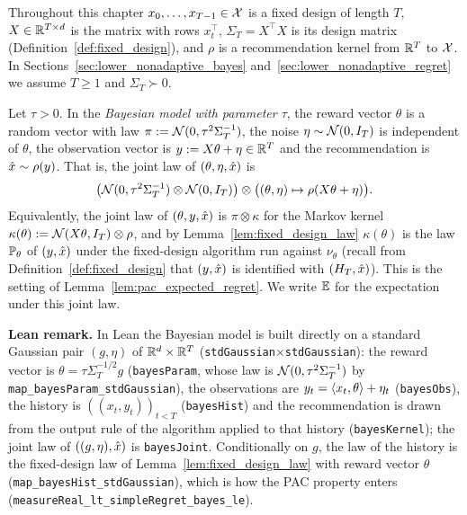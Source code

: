 Throughout this chapter $x_0, \dots, x_{T-1} \in \mathcal{X}$ is a fixed design of length $T$,
$X \in \mathbb{R}^{T\times d}$ is the matrix with rows $x_t^\top$, $\Sigma_T = X^\top X$ is its design
matrix (Definition~\ref{def:fixed_design}), and $\rho$ is a recommendation kernel from
$\mathbb{R}^T$ to $\mathcal{X}$. In Sections~\ref{sec:lower_nonadaptive_bayes}
and~\ref{sec:lower_nonadaptive_regret} we assume $T \ge 1$ and $\Sigma_T \succ 0$.

\begin{definition}\label{def:bayes_prior}
\leanok
{}
Let $\tau > 0$. In the \emph{Bayesian model with parameter $\tau$}, the reward vector
$\theta$ is a random vector with law $\pi := \mathcal{N}(0, \tau^2\Sigma_T^{-1})$, the noise
$\eta \sim \mathcal{N}(0, I_T)$ is independent of $\theta$, the observation vector is
$y := X\theta + \eta \in \mathbb{R}^T$ and the recommendation is $\hat{x} \sim \rho(y)$. That is, the
joint law of $(\theta, \eta, \hat{x})$ is
\[
  \big(\mathcal{N}(0,\tau^2\Sigma_T^{-1}) \otimes \mathcal{N}(0, I_T)\big)
  \otimes \big( (\theta,\eta) \mapsto \rho(X\theta + \eta) \big).
\]
Equivalently, the joint law of $(\theta, y, \hat{x})$ is $\pi \otimes \kappa$ for the Markov
kernel $\kappa(\theta) := \mathcal{N}(X\theta, I_T) \otimes \rho$, and by
Lemma~\ref{lem:fixed_design_law} $\kappa(\theta)$ is the law $\mathbb{P}_\theta$ of $(y, \hat{x})$ under
the fixed-design algorithm run against $\nu_\theta$ (recall from
Definition~\ref{def:fixed_design} that $(y, \hat{x})$ is identified with $(H_T, \hat{x})$). This
is the setting of Lemma~\ref{lem:pac_expected_regret}. We write $\mathbb{E}$ for
the expectation under this joint law.
\end{definition}

\textbf{Lean remark.} In Lean the Bayesian model is built directly on a standard Gaussian pair
$(g,\eta)$ of $\mathbb{R}^d\times\mathbb{R}^T$ (\texttt{stdGaussian}$\times$\texttt{stdGaussian}): the reward
vector is $\theta = \tau\Sigma_T^{-1/2}g$ (\texttt{bayesParam}, whose law is
$\mathcal{N}(0,\tau^2\Sigma_T^{-1})$ by \texttt{map\_bayesParam\_stdGaussian}), the observations are
$y_t = \langle x_t, \theta \rangle + \eta_t$ (\texttt{bayesObs}), the history is
$((x_t,y_t))_{t<T}$ (\texttt{bayesHist}) and the recommendation is drawn from the output rule of
the algorithm applied to that history (\texttt{bayesKernel}); the joint law of $((g,\eta),\hat{x})$
is \texttt{bayesJoint}. Conditionally on $g$, the law of the history is the fixed-design law of
Lemma~\ref{lem:fixed_design_law} with reward vector $\theta$
(\texttt{map\_bayesHist\_stdGaussian}), which is how the PAC property enters
(\texttt{measureReal\_lt\_simpleRegret\_bayes\_le}).

